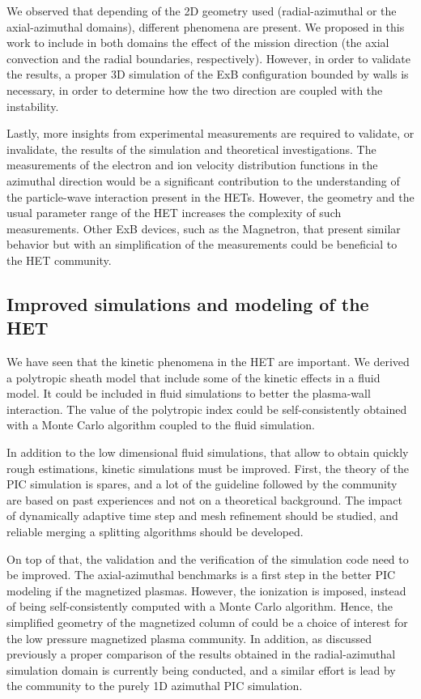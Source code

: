 We observed that depending of the 2D geometry used (radial-azimuthal or the axial-azimuthal domains), different phenomena are present.
We proposed in this work to include in both domains the effect of the mission direction (the axial convection and the radial boundaries, respectively).
However, in order to validate the results, a proper 3D simulation of the ExB configuration bounded by walls is necessary, in order to determine how the two direction are coupled with the instability.

Lastly, more insights from experimental measurements are required to validate, or invalidate, the results of the simulation and theoretical investigations.
The measurements of the electron and ion velocity distribution functions in the azimuthal direction would be a significant contribution to the understanding of the particle-wave interaction present in the HETs.
However, the geometry and the usual parameter range of the HET increases the complexity of such measurements.
Other ExB devices, such as the Magnetron, that present similar behavior but with an simplification of the measurements could be beneficial to the HET community.

\subsection{Improved simulations and modeling of the HET}

We have seen that the kinetic phenomena in the HET are important.
We derived a polytropic sheath model that include some of the kinetic effects in a fluid model.
It could be included in fluid simulations to better the plasma-wall interaction.
The value of the polytropic index could be self-consistently obtained with a Monte Carlo algorithm coupled to the fluid simulation.

In addition to the low dimensional fluid simulations, that allow to obtain quickly rough estimations, kinetic simulations must be improved.
First, the theory of the PIC simulation is spares, and a lot of the guideline followed by the community are based on past experiences and not on a theoretical background.
The impact of dynamically adaptive time step and mesh refinement should be studied, and reliable merging a splitting algorithms should be developed.

On top of that, the validation and the verification of the simulation code need to be improved.
The axial-azimuthal benchmarks \citep{charoy2019} is a first step in the better PIC modeling if the magnetized plasmas.
However, the ionization is imposed, instead of being self-consistently computed with a Monte Carlo algorithm.
Hence, the simplified geometry of the magnetized column of \citet{lucken2019} could be a choice of interest for the low pressure magnetized plasma community.
In addition, as discussed previously a proper comparison of the results obtained in the radial-azimuthal simulation domain is currently being conducted, and a similar effort is lead by the community to the purely 1D azimuthal PIC simulation.

